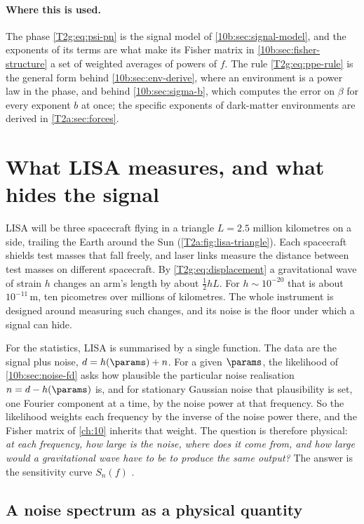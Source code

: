 \paragraph{Where this is used.}
The phase \eqref{T2g:eq:psi-pn} is the signal model of \cref{10b:sec:signal-model}, and the exponents of its terms are what make its Fisher matrix in \cref{10b:sec:fisher-structure} a set of weighted averages of powers of $f$. The rule \eqref{T2g:eq:ppe-rule} is the general form behind \cref{10b:sec:env-derive}, where an environment is a power law in the phase, and behind \cref{10b:sec:sigma-b}, which computes the error on $\beta$ for every exponent $b$ at once; the specific exponents of dark-matter environments are derived in \cref{T2a:sec:forces}.
\section{What LISA measures, and what hides the signal}
\label{T2a:sec:lisa}

LISA will be three spacecraft flying in a triangle $L=2.5$ million kilometres on a side, trailing the Earth around the Sun (\cref{T2a:fig:lisa-triangle}). Each spacecraft shields test masses that fall freely, and laser links measure the distance between test masses on different spacecraft. By \eqref{T2g:eq:displacement} a gravitational wave of strain $h$ changes an arm's length by about $\tfrac12hL$. For $h\sim10^{-20}$ that is about $10^{-11}$\,m, ten picometres over millions of kilometres. The whole instrument is designed around measuring such changes, and its noise is the floor under which a signal can hide.

For the statistics, LISA is summarised by a single function. The data are the signal plus noise, $d=h(\params)+n$. For a given $\params$, the likelihood of \cref{10b:sec:noise-fd} asks how plausible the particular noise realisation $n=d-h(\params)$ is, and for stationary Gaussian noise that plausibility is set, one Fourier component at a time, by the noise power at that frequency. So the likelihood weights each frequency by the inverse of the noise power there, and the Fisher matrix of \cref{ch:10} inherits that weight. The question is therefore physical: \emph{at each frequency, how large is the noise, where does it come from, and how large would a gravitational wave have to be to produce the same output?} The answer is the sensitivity curve $S_n(f)$ \cite{Robson2019}.

\subsection{A noise spectrum as a physical quantity}

